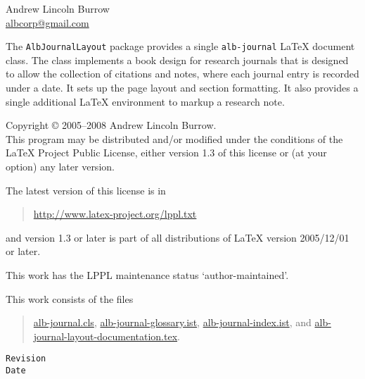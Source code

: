 \documentclass[11pt,a4paper,oneside,titlepage]{alb-corp}
\begin{document}



\begin{albTitlePage}


  Andrew Lincoln Burrow\\
  \url{albcorp@gmail.com}



  The \texttt{AlbJournalLayout} package provides a single
  \texttt{alb-journal} \LaTeX{} document class.  The class implements a
  book design for research journals that is designed to allow the
  collection of citations and notes, where each journal entry is
  recorded under a date.  It sets up the page layout and section
  formatting.  It also provides a single additional \LaTeX{} environment
  to markup a research note.



  Copyright \copyright{} 2005--2008 Andrew Lincoln Burrow.\\
  This program may be distributed and/or modified under the conditions
  of the \LaTeX{} Project Public License, either version 1.3 of this
  license or (at your option) any later version.

  \medskip{}

  The latest version of this license is in
  \begin{quote}
    \url{http://www.latex-project.org/lppl.txt}
  \end{quote}
  and version 1.3 or later is part of all distributions of LaTeX version
  2005/12/01 or later.

  \medskip{}

  This work has the LPPL maintenance status `author-maintained'.

  \medskip{}

  This work consists of the files
  \begin{quote}
    \begin{flushleft}
      \url{alb-journal.cls}, \url{alb-journal-glossary.ist},
      \url{alb-journal-index.ist}, and
      \url{alb-journal-layout-documentation.tex}.
    \end{flushleft}
  \end{quote}



  \verb$Revision$\\
  \verb$Date$

\end{albTitlePage}
\end{document}
